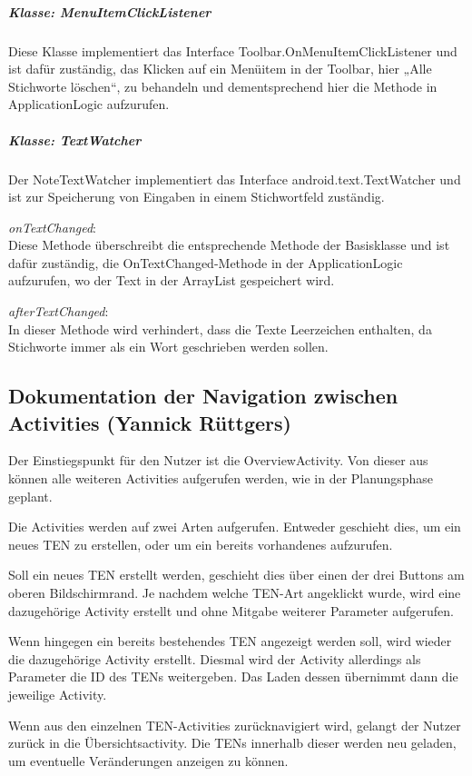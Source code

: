 \subparagraph{Klasse: MenuItemClickListener}
Diese Klasse implementiert das Interface Toolbar.OnMenuItemClickListener und ist dafür zuständig, das Klicken auf ein Menüitem in der Toolbar, hier „Alle Stichworte löschen“, zu behandeln und dementsprechend hier die Methode in ApplicationLogic aufzurufen.

\subparagraph{Klasse: TextWatcher}
Der NoteTextWatcher implementiert das Interface android.text.TextWatcher und ist zur Speicherung von Eingaben in einem Stichwortfeld zuständig.

\textit{onTextChanged}:\\
Diese Methode überschreibt die entsprechende Methode der Basisklasse und ist dafür zuständig, die OnTextChanged-Methode in der ApplicationLogic aufzurufen, wo der Text in der ArrayList gespeichert wird.

\textit{afterTextChanged}:\\
In dieser Methode wird verhindert, dass die Texte Leerzeichen enthalten, da Stichworte immer als ein Wort geschrieben werden sollen.

\newpage
\fancyhead[L]{}
\subsection{Dokumentation der Navigation zwischen Activities (Yannick Rüttgers)}

Der Einstiegspunkt für den Nutzer ist die OverviewActivity. Von dieser aus können alle weiteren Activities aufgerufen werden, wie in der Planungsphase geplant.

Die Activities werden auf zwei Arten aufgerufen. Entweder geschieht dies, um ein neues TEN zu erstellen, oder um ein bereits vorhandenes aufzurufen.

Soll ein neues TEN erstellt werden, geschieht dies über einen der drei Buttons am oberen Bildschirmrand. Je nachdem welche TEN-Art angeklickt wurde, wird eine dazugehörige Activity erstellt und ohne Mitgabe weiterer Parameter aufgerufen.

Wenn hingegen ein bereits bestehendes TEN angezeigt werden soll, wird wieder die dazugehörige Activity erstellt. Diesmal wird der Activity allerdings als Parameter die ID des TENs weitergeben. Das Laden dessen übernimmt dann die jeweilige Activity.

Wenn aus den einzelnen TEN-Activities zurücknavigiert wird, gelangt der Nutzer zurück in die Übersichtsactivity. Die TENs innerhalb dieser werden neu geladen, um eventuelle Veränderungen anzeigen zu können.

